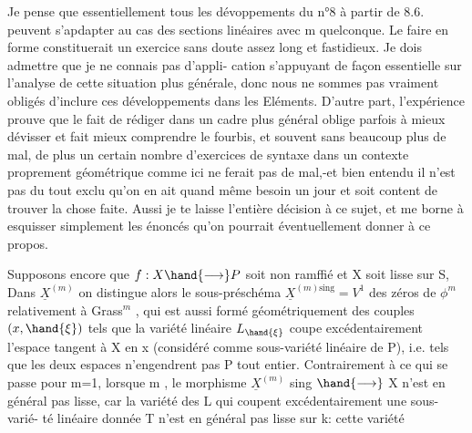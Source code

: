 

Je pense que essentiellement tous les dévoppements du n°8 à
partir de 8.6. peuvent s'apdapter  au cas des sections linéaires avec
m quelconque. Le faire en forme constituerait un exercice sans doute
assez long et fastidieux. Je dois admettre que je ne connais pas d'appli-%
cation s'appuyant de façon essentielle sur l'analyse de cette situation
plus générale, donc nous ne sommes pas vraiment obligés d'inclure ces
développements dans les Eléments. D'autre part, l'expérience prouve que
le fait de rédiger dans un cadre plus général oblige parfois à mieux
dévisser et fait mieux comprendre le fourbis, et souvent sans beaucoup
plus de mal, de plus un certain nombre d'exercices de syntaxe dans un
contexte proprement géométrique comme ici ne ferait pas de mal,-et
bien entendu il n'est pas du tout exclu qu'on en ait quand même besoin
un jour et soit content de trouver la chose faite. Aussi je te laisse
l'entière décision à ce sujet, et me borne à esquisser simplement les
énoncés qu'on pourrait éventuellement donner à ce propos.

Supposons encore que $f:X \hand{\longrightarrow} P$ soit non ramffié et X soit lisse sur
S, \hand{(}Dans $\underline{X}^{(m)}$  on distingue alors le sous-préschéma $\underline{X}^{(m)\mathrm{sing}} = V^1$
des zéros  de $\phi^m$ relativement à Grass$^m$ , qui est aussi formé
géométriquement des couples $(x,\hand{\xi})$ tels que la variété linéaire $L_{\hand{\xi}}$
coupe excédentairement l'espace tangent à X en x (considéré comme
sous-variété linéaire de P), i.e. tels que les deux espaces n'engendrent
pas P tout entier. Contrairement à ce qui se passe pour m=1, lorsque
m , le morphisme $\underline{X}^{(m)}$ sing $\hand{\longrightarrow}$ X n'est en général pas
lisse, car la variété des L qui \hand{(}coupent excédentairement une sous-varié-%
té linéaire donnée T n'est en général pas lisse sur k: cette variété

